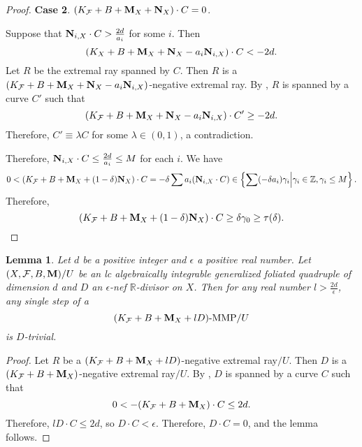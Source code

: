\documentclass[11pt]{amsart}
\numberwithin{equation}{section}
\newcommand{\Mm}{{\bf{M}}}
\newcommand{\Nn}{{\bf{N}}}
\newcommand{\Rr}{\mathbb{R}}
\newcommand{\Ff}{\mathcal{F}}
\newtheorem{lem}[thm]{Lemma}
\theoremstyle{definition}
\theoremstyle{definition}
\theoremstyle{definition}
\begin{document}
\begin{proof}
\medskip

\noindent\textbf{Case 2}. $(K_{\Ff}+B+\Mm_X+\Nn_X)\cdot C=0$. 

Suppose that $\Nn_{i,X}\cdot C>\frac{2d}{a_i}$ for some $i$. Then
    $$(K_X+B+\Mm_X+\Nn_X-a_i\Nn_{i,X})\cdot C<-2d.$$
    Let $R$ be the extremal ray spanned by $C$. Then $R$ is a $(K_{\Ff}+B+\Mm_X+\Nn_X-a_i\Nn_{i,X})$-negative extremal ray. By \cite[Theorem 2.3.1]{CHLX23}, $R$ is spanned by a curve $C'$ such that 
$$(K_{\Ff}+B+\Mm_X+\Nn_X-a_i\Nn_{i,X})\cdot C'\geq-2d.$$
Therefore, $C'\equiv \lambda C$ for some $\lambda\in (0,1)$, a contradiction.

Therefore, $\Nn_{i,X}\cdot C\leq\frac{2d}{a_i}\leq M$ for each $i$. We have
$$0<(K_{\Ff}+B+\Mm_X+(1-\delta)\Nn_X)\cdot C=-\delta\sum a_i(\Nn_{i,X}\cdot C)\in \left\{\sum(-\delta a_i)\gamma_i\Big| \gamma_i\in\mathbb Z,\gamma_i\leq M\right\}.$$
Therefore,
$$(K_{\Ff}+B+\Mm_X+(1-\delta)\Nn_X)\cdot C\geq\delta\gamma_0\geq\tau(\delta).$$
\end{proof}

\begin{lem}\label{lem: single step enef trivial}
    Let $d$ be a positive integer and $\epsilon$ a positive real number. Let $(X,\Ff,B,\Mm)/U$ be an lc algebraically integrable generalized foliated quadruple of dimension $d$ and $D$ an $\epsilon$-nef $\Rr$-divisor on $X$. Then for any real number $l>\frac{2d}{\epsilon}$, any single step of a
    $$(K_{\Ff}+B+\Mm_X+lD)\text{-MMP}/U$$
    is $D$-trivial.
\end{lem}
\begin{proof}
    Let $R$ be a $(K_{\Ff}+B+\Mm_X+lD)$-negative extremal ray$/U$. Then $D$ is a $(K_{\Ff}+B+\Mm_X)$-negative extremal ray$/U$. By \cite[Theorem 2.3.1]{CHLX23}, $D$ is spanned by a curve $C$ such that 
    $$0<-(K_{\Ff}+B+\Mm_X)\cdot C\leq 2d.$$
    Therefore, $lD\cdot C\leq 2d$, so $D\cdot C<\epsilon$. Therefore, $D\cdot C=0$, and the lemma follows.
\end{proof}
\end{document}
